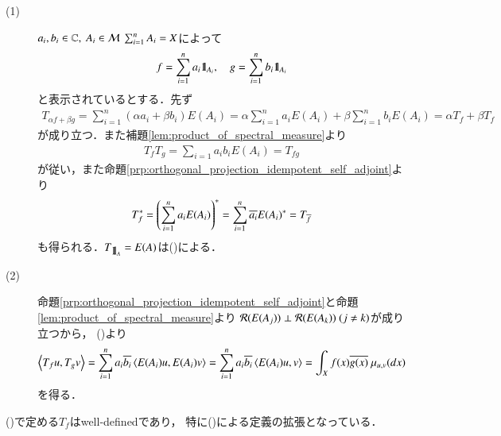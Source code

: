 	\begin{prf}\mbox{}
		\begin{description}
			\item[(1)] $a_i,b_i \in \C,\ A_i \in \mathcal{M}\ \sum_{i=1}^{n} A_i = X$によって
				\begin{align}
					f = \sum_{i=1}^{n} a_i \mbox{1}\hspace{-0.25em}\mbox{l}_{A_i},
					\quad g = \sum_{i=1}^{n} b_i \mbox{1}\hspace{-0.25em}\mbox{l}_{A_i}
				\end{align}
				と表示されているとする．先ず
				\begin{align}
					T_{\alpha f + \beta g} = \sum_{i=1}^{n} (\alpha a_i + \beta b_i) E(A_i) = \alpha \sum_{i=1}^{n} a_i E(A_i) + \beta \sum_{i=1}^{n} b_i E(A_i) = \alpha T_f + \beta T_f
				\end{align}
				が成り立つ．また補題\ref{lem:product_of_spectral_measure}より
				\begin{align}
					T_f T_g = \sum_{i=1} a_i b_i E(A_i) = T_{fg}
				\end{align}
				が従い，また命題\ref{prp:orthogonal_projection_idempotent_self_adjoint}より
				\begin{align}
					T_f^* = \left( \sum_{i=1}^n a_i E(A_i) \right)^* = \sum_{i=1}^n \overline{a_i} E(A_i)^* = T_{\overline{f}}
				\end{align}
				も得られる．$T_{\mbox{1}\hspace{-0.25em}\mbox{l}_A} = E(A)$は()による．
			
			\item[(2)] 命題\ref{prp:orthogonal_projection_idempotent_self_adjoint}と命題\ref{lem:product_of_spectral_measure}より
				$\mathcal{R}( E(A_j) ) \perp \mathcal{R}( E(A_k) )\ (j \neq k)$が成り立つから，
				()より
				\begin{align}
					\inprod<T_f u, T_g v> 
					= \sum_{i=1}^{n} a_i \conj{b_i} \inprod<E(A_i) u, E(A_i) v> 
					= \sum_{i=1}^{n} a_i \conj{b_i} \inprod<E(A_i) u, v>
					= \int_X f(x) \conj{g(x)}\ \mu_{u,v}(dx)
				\end{align}
				を得る．
				\QED
		\end{description}
	\end{prf}
	
	\begin{screen}
		\begin{thm}
			()で定める$T_f$はwell-definedであり，
			特に()による定義の拡張となっている．
		\end{thm}
	\end{screen}
	
